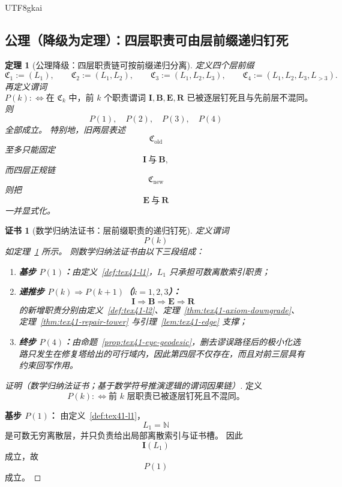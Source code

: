 \documentclass[12pt]{article}
\newtheorem{theorem}{定理}[section]
\newtheorem{Certificate}{证书}[section]
\newcommand{\NN}{\mathbb{N}}
\begin{document}
\begin{CJK*}{UTF8}{gkai}
\subsection{公理（降级为定理）：四层职责可由层前缀递归钉死}
\label{subsec:tex41-upgrade-axiom-downgrade}

\begin{theorem}[公理降级：四层职责链可按前缀递归分离]
\label{thm:tex41-upgrade-induction}
定义四个层前缀
\[
  \mathfrak C_1:=(L_1),\qquad
  \mathfrak C_2:=(L_1,L_2),\qquad
  \mathfrak C_3:=(L_1,L_2,L_3),\qquad
  \mathfrak C_4:=(L_1,L_2,L_3,L_{>3}).
\]
再定义谓词
\[
  P(k)
  :
  \Longleftrightarrow
  \text{在 }\mathfrak C_k\text{ 中，前 }k\text{ 个职责谓词 }
  \mathbf I,\mathbf B,\mathbf E,\mathbf R
  \text{ 已被逐层钉死且与先前层不混同。}
\]
则
\[
  P(1),\quad P(2),\quad P(3),\quad P(4)
\]
全部成立。
特别地，旧两层表述
\[
  \mathfrak C_{\mathrm{old}}
\]
至多只能固定
\[
  \mathbf I\ \text{与}\ \mathbf B,
\]
而四层正规链
\[
  \mathfrak C_{\mathrm{new}}
\]
则把
\[
  \mathbf E\ \text{与}\ \mathbf R
\]
一并显式化。
\end{theorem}

\begin{Certificate}[数学归纳法证书：层前缀职责的递归钉死]
\label{cert:tex41-upgrade-induction}
定义谓词
\[
  P(k)
\]
如定理~\ref{thm:tex41-upgrade-induction} 所示。
则数学归纳法证书由以下三段组成：
\begin{enumerate}
  \item \textbf{基步 $P(1)$：}由定义~\ref{def:tex41-l1}，$L_1$ 只承担可数离散索引职责；
  \item \textbf{递推步 $P(k)\Rightarrow P(k+1)$（$k=1,2,3$）：}
  \[
    \mathbf I
    \Longrightarrow
    \mathbf B
    \Longrightarrow
    \mathbf E
    \Longrightarrow
    \mathbf R
  \]
  的新增职责分别由定义~\ref{def:tex41-l2}、定理~\ref{thm:tex41-axiom-downgrade}、定理~\ref{thm:tex41-repair-tower} 与引理~\ref{lem:tex41-edge} 支撑；
  \item \textbf{终步 $P(4)$：}由命题~\ref{prop:tex41-eye-geodesic}，删去谬误路径后的极小化选路只发生在修复塔给出的可行域内，因此第四层不仅存在，而且对前三层具有约束回写作用。
\end{enumerate}
\end{Certificate}

\begin{proof}[证明（数学归纳法证书；基于数学符号推演逻辑的谓词因果链）]
定义
\[
  P(k)
  :
  \Longleftrightarrow
  \text{前 }k\text{ 层职责已被逐层钉死且不混同。}
\]

\textbf{基步 $P(1)$：}
由定义~\ref{def:tex41-l1}，
\[
  L_1=\NN
\]
是可数无穷离散层，并只负责给出局部离散索引与证书槽。
因此
\[
  \mathbf I(L_1)
\]
成立，故
\[
  P(1)
\]
成立。


\end{proof}
\end{CJK*}
\end{document}
